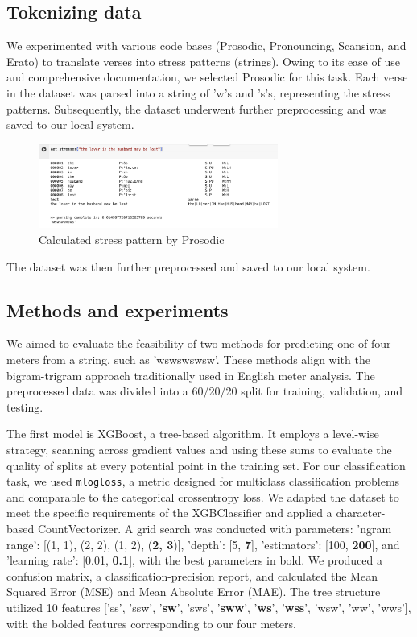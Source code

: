 \documentclass{article}
\begin{document}
\subsection{Tokenizing data}

We experimented with various code bases (Prosodic, Pronouncing, Scansion, and Erato) to translate verses into stress patterns (strings). Owing to its ease of use and comprehensive documentation, we selected Prosodic for this task. Each verse in the dataset was parsed into a string of 'w's and 's's, representing the stress patterns. Subsequently, the dataset underwent further preprocessing and was saved to our local system.
\begin{figure}[h!]
 \centering
 \includegraphics[width=0.7\textwidth]{images/stressed_line.png}
 \caption{Calculated stress pattern by Prosodic }
\end{figure}
The dataset was then further preprocessed and saved to our local system.


\subsection{Methods and experiments}

We aimed to evaluate the feasibility of two methods for predicting one of four meters from a string, such as 'wswswswsw'. These methods align with the bigram-trigram approach traditionally used in English meter analysis. The preprocessed data was divided into a 60/20/20 split for training, validation, and testing.

The first model is XGBoost, a tree-based algorithm. It employs a level-wise strategy, scanning across gradient values and using these sums to evaluate the quality of splits at every potential point in the training set. For our classification task, we used \verb|mlogloss|, a metric designed for multiclass classification problems and comparable to the categorical crossentropy loss. We adapted the dataset to meet the specific requirements of the XGBClassifier and applied a character-based CountVectorizer. A grid search was conducted with parameters: 'ngram range': [(1, 1), (2, 2), (1, 2), (\textbf{2, 3})], 'depth': [5, \textbf{7}], 'estimators': [100, \textbf{200}], and 'learning rate': [0.01, \textbf{0.1}], with the best parameters in bold. We produced a confusion matrix, a classification-precision report, and calculated the Mean Squared Error (MSE) and Mean Absolute Error (MAE). The tree structure utilized 10 features ['ss', 'ssw', '\textbf{sw}', 'sws', '\textbf{sww}', '\textbf{ws}', '\textbf{wss}', 'wsw', 'ww', 'wws'], with the bolded features corresponding to our four meters.
\end{document}
